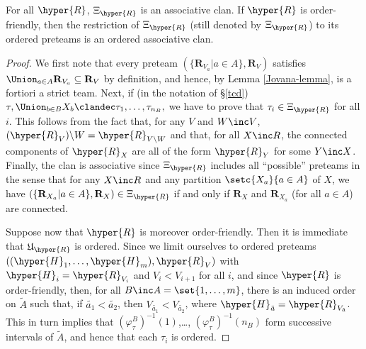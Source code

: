  
 \begin{proposition} \label{Xi-K-strict-associative}
For all $\hyper{R}$, $\Xi_\hyper{R}$ is an associative clan.  If $\hyper{R}$ is order-friendly, then the restriction of $\Xi_\hyper{R}$ (still denoted by $\Xi_\hyper{R}$) to its ordered preteams is an ordered associative clan.
\end{proposition}
\begin{proof}  
We first note that 
every preteam $(\{\mathbf{R}_{V_a} | a \in A\}, \mathbf{R}_V)$ satisfies $\Union_{a\in A} \mathbf{R}_{V_a} \subseteq \mathbf{R}_V$ by definition, and hence, by  Lemma \ref{Jovana-lemma}, is a fortiori a strict team. Next, if (in the notation of \S\ref{tcd})
$\tau, \Union_{b\in B}X_b\clandec \tau_1,\ldots,\tau_{n_B},$ we have to prove that $\tau_i\in \Xi_\hyper{R}$ for all $i$. This follows from the fact that, for any $V$ and $W\inc V$, $(\hyper{R}_V)\backslash W=\hyper{R}_{V\backslash W}$ and that, for all $X\inc R$, the connected components of $\hyper{R}_X$ are all of the form $\hyper{R}_Y$ for some $Y\inc X$.  Finally, the clan is associative since $\Xi_\hyper{R}$ includes all ``possible'' preteams in the sense that  for any $X\inc R$ and any partition $\setc{X_a}{a\in A}$ of $X$, we have $(\{\mathbf{R}_{X_a} | a \in A\}, \mathbf{R}_X)\in  \Xi_\hyper{R}$ if and only if  $\mathbf{R}_X$ and $\mathbf{R}_{X_a}$ (for all $a\in A$) are connected.

Suppose now that $\hyper{R}$ is moreover order-friendly. Then  it is immediate that $\mathfrak{U}_{\hyper{R}}$ is ordered. Since we limit ourselves to ordered preteams  $((\hyper{H}_1,\ldots,\hyper{H}_m),\hyper{R}_V)$ with  $\hyper{H}_i=\hyper{R}_{V_i}$ and $V_i<V_{i+1}$ for all $i$, and since $\hyper{R}$ is order-friendly, then, for all $B\inc A=\set{1,\ldots,m}$, there is an induced order on $\tilde{A}$ such that, if $\tilde{a_1}<\tilde{a_2}$, then $V_{\tilde{a_1}}<V_{\tilde{a_2}}$, where $\hyper{H}_{\tilde{a}}=\hyper{R}_{V_{\tilde{a}}}$. This in turn implies that $(\varphi^B_\tau)^{-1}(1)$,\ldots,  $(\varphi^B_\tau)^{-1}(n_B)$ form successive intervals of $\tilde{A}$, and hence that each $\tau_i$ is ordered.
\end{proof}


